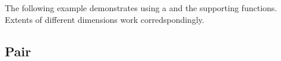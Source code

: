 The following example demonstrates using a  and the
supporting functions. Extents of different dimensions work
corredspondingly.


\subsection{Pair}





\section{}

